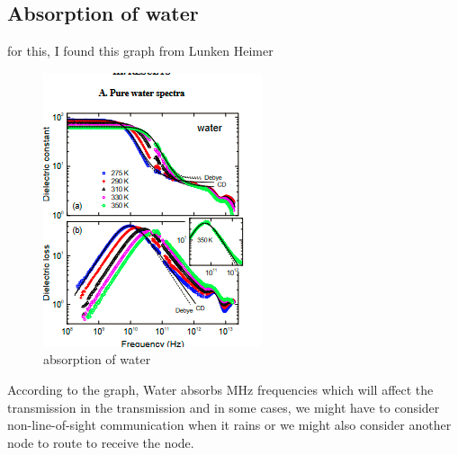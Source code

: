 \subsection{Absorption of water}
for this, I found this graph from Lunken Heimer \cite{lunken} 

\begin{figure}[h!]
	\centering
	\includegraphics[width=0.5\linewidth]{Images/absorstion.png}
	\caption{absorption of water}
	\label{absorption of water}
\end{figure}

According to the  graph, Water absorbs MHz frequencies which will affect the  transmission 
in the transmission and in some cases, we might have to consider non-line-of-sight communication when it rains or we might also consider another node to route to receive the node.

